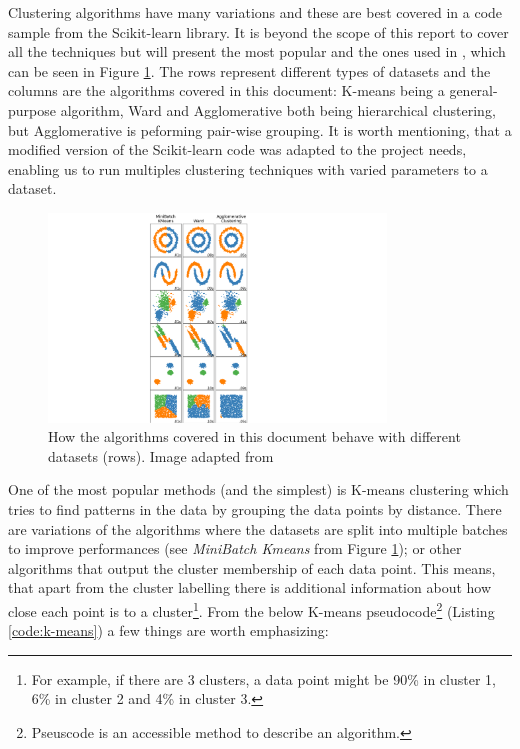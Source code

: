 Clustering algorithms have many variations and these are best covered in a code sample\cite{Scikit-learn_undated-ax} from the Scikit-learn library\cite{Pedregosa2011-ts}. It is beyond the scope of this report to cover all the techniques but will present the most popular and the ones used in , which can be seen in Figure \ref{fig:clustering_types}. The rows represent different types of datasets and the columns are the algorithms covered in this document: K-means being a general-purpose algorithm, Ward and Agglomerative both being hierarchical clustering, but Agglomerative is peforming pair-wise grouping. It is worth mentioning, that a modified version of the Scikit-learn code was adapted to the project needs, enabling us to run multiples clustering techniques with varied parameters to a dataset. 

\begin{figure}[!htb]
  \centering\includegraphics[width=0.8\textwidth,height=0.5\textheight,keepaspectratio]{Images/Clustering/scikit_selected.png}
    \caption{How the algorithms covered in this document behave with different datasets (rows). Image adapted from \cite{Scikit-learn_undated-ax}}
    \label{fig:clustering_types}
\end{figure}
\FloatBarrier

One of the most popular methods (and the simplest) is K-means clustering which tries to find patterns in the data by grouping the data points by distance. There are variations of the algorithms where the datasets are split into multiple batches to improve performances (see \textit{MiniBatch Kmeans} from Figure \ref{fig:clustering_types}); or other algorithms that output the cluster membership of each data point. This means, that apart from the cluster labelling there is additional information about how close each point is to a cluster\footnote{For example, if there are 3 clusters, a data point might be 90\% in cluster 1, 6\% in cluster 2 and 4\% in cluster 3.}. From the below K-means pseudocode\footnote{Pseuscode is an accessible method to describe an algorithm.} (Listing \ref{code:k-means}) a few things are worth emphasizing:

